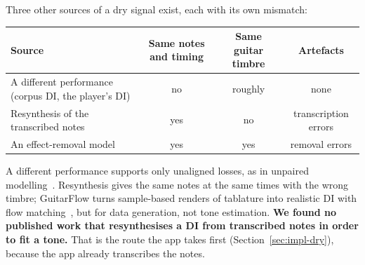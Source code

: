 Three other sources of a dry signal exist, each with its own mismatch:
\begin{center}
\small
\begin{tabular}{@{}>{\raggedright}p{4.2cm}ccc@{}}
\toprule
Source & Same notes and timing & Same guitar timbre & Artefacts \\
\midrule
A different performance (corpus DI, the player's DI) & no & roughly & none \\
Resynthesis of the transcribed notes & yes & no & transcription errors \\
An effect-removal model & yes & yes & removal errors \\
\bottomrule
\end{tabular}
\end{center}
A different performance supports only unaligned losses, as in unpaired
modelling~\cite{wright2023adversarial}. Resynthesis gives the same notes at the
same times with the wrong timbre; GuitarFlow turns sample-based renders of
tablature into realistic DI with flow matching~\cite{loth2025guitarflow}, but for
data generation, not tone estimation. \textbf{We found no published work that
resynthesises a DI from transcribed notes in order to fit a tone.} That is the
route the app takes first (Section~\ref{sec:impl-dry}), because the app already
transcribes the notes.
